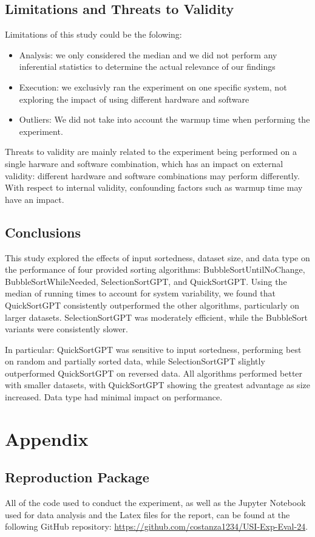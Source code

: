 \documentclass[unicode,11pt,a4paper,oneside,numbers=endperiod,openany]{scrartcl}
\begin{document}
    \subsection{Limitations and Threats to Validity}

    Limitations of this study could be the folowing:
    \begin{itemize}
        \item Analysis: we only considered the median and we did not perform any inferential statistics to determine the actual relevance of our findings
        \item Execution: we exclusivly ran the experiment on one specific system, not exploring the impact of using different hardware and software
        \item Outliers: We did not take into account the warmup time when performing the experiment.
    \end{itemize}

    Threats to validity are mainly related to the experiment being performed on a single harware and software combination, which has an impact on external validity: different hardware and software combinations may perform differently. With respect to internal validity, confounding factors such as warmup time may have an impact.



    \subsection{Conclusions}

    This study explored the effects of input sortedness, dataset size, and data type on the performance of four provided sorting algorithms: BubbleSortUntilNoChange, BubbleSortWhileNeeded, SelectionSortGPT, and QuickSortGPT. Using the median of running times to account for system variability, we found that QuickSortGPT consistently outperformed the other algorithms, particularly on larger datasets. SelectionSortGPT was moderately efficient, while the BubbleSort variants were consistently slower.

    In particular: QuickSortGPT was sensitive to input sortedness, performing best on random and partially sorted data, while SelectionSortGPT slightly outperformed QuickSortGPT on reversed data. All algorithms performed better with smaller datasets, with QuickSortGPT showing the greatest advantage as size increased. Data type had minimal impact on performance.


\section{Appendix}

    \subsection{Reproduction Package}
    All of the code used to conduct the experiment, as well as the Jupyter Notebook used for data analysis and the Latex files for the report, can be found at the following GitHub repository: \url{https://github.com/costanza1234/USI-Exp-Eval-24}.
\end{document}
